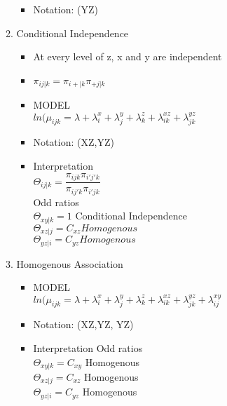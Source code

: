 \documentclass[12 pt]{article}
\begin{document}
\begin{enumerate}
\begin{enumerate}
\begin{itemize}
                        \item Notation: (YZ)
                    \end{itemize}
                \item Conditional Independence
                    \begin{itemize}
                        \item At every level of z, x and y are independent
                        \item \( \pi_{ij|k} = \pi_{i+|k} \pi_{+j|k} \)
                        \item MODEL \\
                            $ln(\mu_{ijk} = \lambda + \lambda^x_i + \lambda^y_j + \lambda^z_k + \lambda^{xz}_{ik} + \lambda^{yz}_{jk}$ \\
                        \item Notation: (XZ,YZ)
                        \item Interpretation \\
                        $ \Theta_{ij|k} = \dfrac{\pi_{ijk}\pi_{i\prime j \prime k}}{\pi_{ij\prime k} \pi_{i\prime jk}} $\\
                        Odd ratios \\
                        $ \Theta_{xy|k} = 1$  Conditional Independence\\
                        $ \Theta_{xz|j} = C_{xz} Homogenous$\\
                        $ \Theta_{yz|i} = C_{yz} Homogenous$
                    \end{itemize}
                \item Homogenous Association
                    \begin{itemize}
                        \item MODEL \\
                            $ln(\mu_{ijk} = \lambda + \lambda^x_i + \lambda^y_j + \lambda^z_k + \lambda^{xz}_{ik} + \lambda^{yz}_{jk} + \lambda^{xy}_{ij}$ \\
                        \item Notation: (XZ,YZ, YZ)
                        \item Interpretation
                        Odd ratios \\
                        $ \Theta_{xy|k} = C_{xy}$ Homogenous\\
                        $ \Theta_{xz|j} = C_{xz}$ Homogenous \\
                        $ \Theta_{yz|i} = C_{yz}$ Homogenous

\end{itemize}
\end{enumerate}
\end{enumerate}
\end{document}
